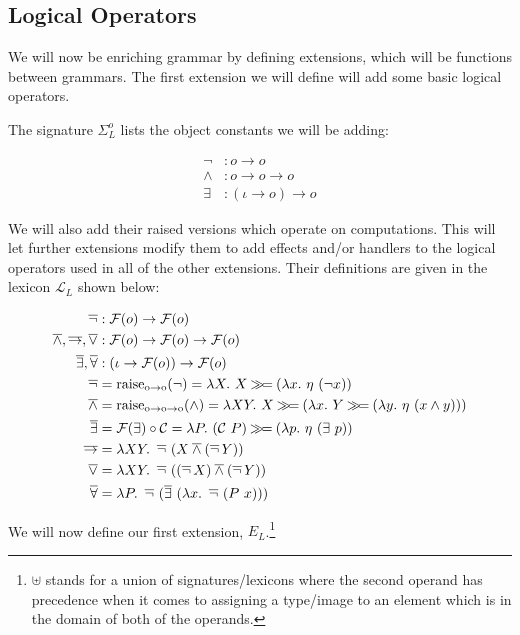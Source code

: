 \subsection{Logical Operators}

We will now be enriching grammar by defining extensions, which will be
functions between grammars. The first extension we will define will add
some basic logical operators.

The signature $\Sigma^o_L$ lists the object constants we will be
adding:

\begin{align*}
  \lnot &: o \to o \\
  \land &: o \to o \to o \\
  \exists &: (\iota \to o) \to o
\end{align*}

We will also add their raised versions which operate on computations. This
will let further extensions modify them to add effects and/or handlers to
the logical operators used in all of the other extensions. Their
definitions are given in the lexicon $\mathcal{L}_L$ shown below:

\begin{align*}
  \dnot &: \mathcal{F}(o) \to \mathcal{F}(o) \\
  \dand, \dimp, \dor &: \mathcal{F}(o) \to \mathcal{F}(o) \to \mathcal{F}(o) \\
  \dexists, \dforall &: (\iota \to \mathcal{F}(o)) \to \mathcal{F}(o) \\
  \dnot &= \mathrm{raise_{o \to o}}(\lnot) = \lambda X.\ X \hsbind (\lambda x.\ \eta\ (\lnot x)) \\
  \dand &= \mathrm{raise_{o \to o \to o}}(\land) = \lambda X Y.\ X \hsbind (\lambda x.\ Y \hsbind (\lambda y.\ \eta\ (x \land y))) \\
  \dexists &= \mathcal{F}(\exists) \circ \mathcal{C} = \lambda P.\ (\mathcal{C}\ P) \hsbind (\lambda p.\ \eta\ (\exists\ p)) \\
  \dimp &= \lambda X Y.\ \dnot\ (X \dand (\dnot Y)) \\
  \dor &= \lambda X Y.\ \dnot\ ((\dnot X) \dand (\dnot Y)) \\
  \dforall &= \lambda P.\ \dnot\ (\dexists\ (\lambda x.\ \dnot\ (P\ x)))
\end{align*}

We will now define our first extension, $E_L$.\footnote{$\uplus$ stands for
  a union of signatures/lexicons where the second operand has precedence
  when it comes to assigning a type/image to an element which is in the
  domain of both of the operands.}

